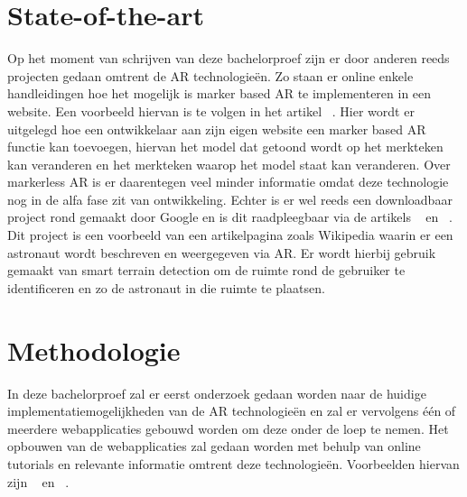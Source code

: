 \section{State-of-the-art}
\label{sec:state-of-the-art}

Op het moment van schrijven van deze bachelorproef zijn er door anderen reeds projecten gedaan omtrent de AR technologieën. Zo staan er online enkele handleidingen hoe het mogelijk is marker based AR te implementeren in een website. Een voorbeeld hiervan is te volgen in het artikel ~\textcite{Etienne2017}. Hier wordt er uitgelegd hoe een ontwikkelaar aan zijn eigen website een marker based AR functie kan toevoegen, hiervan het model dat getoond wordt op het merkteken kan veranderen en het merkteken waarop het model staat kan veranderen. Over markerless AR is er daarentegen veel minder informatie omdat deze technologie nog in de alfa fase zit van ontwikkeling. Echter is er wel reeds een downloadbaar project rond gemaakt door Google en is dit raadpleegbaar via de artikels ~\textcite{Stanush2018} en ~\textcite{Ali2018}. Dit project is een voorbeeld van een artikelpagina zoals Wikipedia waarin er een astronaut wordt beschreven en weergegeven via AR. Er wordt hierbij gebruik gemaakt van smart terrain detection om de ruimte rond de gebruiker te identificeren en zo de astronaut in die ruimte te plaatsen. 





\section{Methodologie}
\label{sec:methodologie}

In deze bachelorproef zal er eerst onderzoek gedaan worden naar de huidige implementatiemogelijkheden van de AR technologieën en zal er vervolgens één of meerdere webapplicaties gebouwd worden om deze onder de loep te nemen. Het opbouwen van de webapplicaties zal gedaan worden met behulp van online tutorials en relevante informatie omtrent deze technologieën. Voorbeelden hiervan zijn ~\textcite{Medley2018} en ~\textcite{Etienne2017}.


